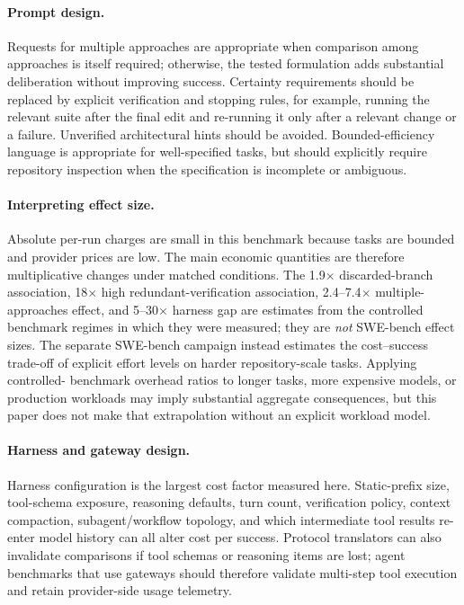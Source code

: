 \documentclass[11pt]{article}
\newcommand{\xd}{$\times$}
\begin{document}
\paragraph{Prompt design.} Requests for multiple approaches are appropriate
when comparison among approaches is itself required; otherwise, the tested
formulation adds substantial deliberation without improving success.
Certainty requirements should be replaced by explicit verification and
stopping rules, for example, running the relevant suite after the final edit
and re-running it only after a relevant change or a failure. Unverified
architectural hints should be avoided. Bounded-efficiency language is
appropriate for well-specified tasks, but should explicitly require
repository inspection when the specification is incomplete or ambiguous.

\paragraph{Interpreting effect size.} Absolute per-run charges are small in
this benchmark because tasks are bounded and provider prices are low. The
main economic quantities are therefore multiplicative changes under matched
conditions. The 1.9\xd{} discarded-branch association, 18\xd{} high
redundant-verification association, 2.4--7.4\xd{} multiple-approaches effect,
and 5--30\xd{} harness gap are estimates from the controlled benchmark regimes
in which they were measured; they are \emph{not} SWE-bench effect sizes. The
separate SWE-bench campaign instead estimates the cost--success trade-off of
explicit effort levels on harder repository-scale tasks. Applying controlled-
benchmark overhead ratios to longer tasks, more expensive models, or production
workloads may imply substantial aggregate consequences, but this paper does not
make that extrapolation without an explicit workload model.

\paragraph{Harness and gateway design.} Harness configuration is the
largest cost factor measured here. Static-prefix size, tool-schema exposure,
reasoning defaults, turn count, verification policy, context compaction,
subagent/workflow topology, and which intermediate tool results re-enter model
history can all alter cost per success. Protocol translators can also
invalidate comparisons if tool schemas or reasoning items are lost; agent
benchmarks that use gateways should therefore validate multi-step tool
execution and retain provider-side usage telemetry.
\end{document}
